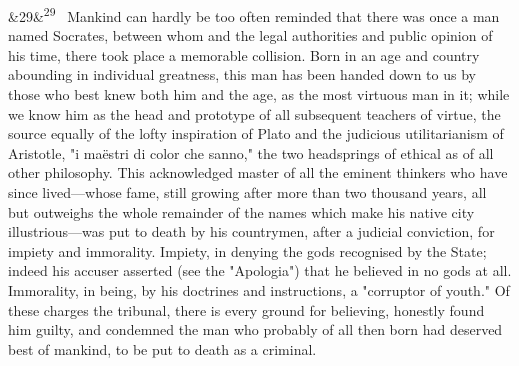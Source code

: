 \documentclass[12pt]{article}
\newcommand{\para}[1][]{\par\noindent\ifx&#1&\else\textsuperscript{\footnotesize #1}~\fi}
\begin{document}
\para[29] Mankind can hardly be too often reminded that there was once a man named Socrates, between whom and the legal authorities and public opinion of his time, there took place a memorable collision. Born in an age and country abounding in individual greatness, this man has been handed down to us by those who best knew both him and the age, as the most virtuous man in it; while we know him as the head and prototype of all subsequent teachers of virtue, the source equally of the lofty inspiration of Plato and the judicious utilitarianism of Aristotle, "i maëstri di color che sanno," the two headsprings of ethical as of all other philosophy. This acknowledged master of all the eminent thinkers who have since lived---whose fame, still growing after more than two thousand years, all but outweighs the whole remainder of the names which make his native city illustrious---was put to death by his countrymen, after a judicial conviction, for impiety and immorality. Impiety, in denying the gods recognised by the State; indeed his accuser asserted (see the "Apologia") that he believed in no gods at all. Immorality, in being, by his doctrines and instructions, a "corruptor of youth." Of these charges the tribunal, there is every ground for believing, honestly found him guilty, and condemned the man who probably of all then born had deserved best of mankind, to be put to death as a criminal.
\end{document}
